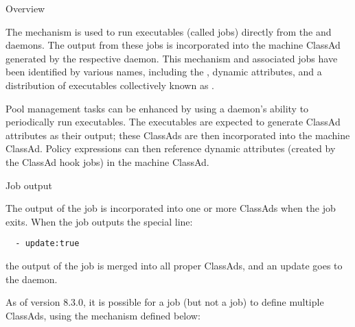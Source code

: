 \begin{description}
\item[Overview]
\end{description}

The  mechanism is
used to run executables (called jobs) directly from the
 and  daemons. 
The output from these jobs is incorporated into the machine ClassAd
generated by the respective daemon.
This mechanism and associated jobs have been identified by various
names, including the , dynamic attributes,
and a distribution of executables collectively known as .

Pool management tasks can be enhanced by using a 
daemon's ability to periodically run executables.
The executables are expected to generate ClassAd attributes as their
output; these ClassAds are then incorporated into the machine ClassAd.
Policy expressions can then reference dynamic attributes (created
by the ClassAd hook jobs) in the machine ClassAd.

\begin{description}
\item[Job output]
\end{description}

The output of the job is incorporated into one or more ClassAds when
the job exits.
When the job outputs the special line:
\begin{verbatim}
  - update:true
\end{verbatim}
the output of the job is merged into all proper ClassAds,
and an update goes to the  daemon.

As of version 8.3.0, it is possible for a  job (but
not a  job) to define multiple ClassAds, using the
mechanism defined below:

